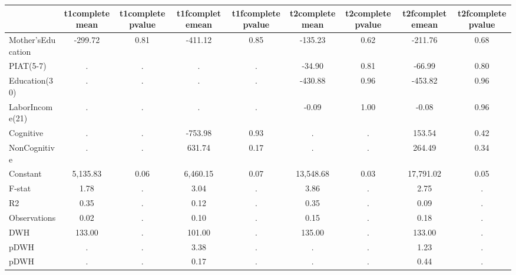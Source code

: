 \begin{table}[htbp]
\begin{tabular}{lcccccccc} \hline \hline
 & t1completemean  & t1completepvalue  & t1fcompletemean  & t1fcompletepvalue  & t2completemean  & t2completepvalue  & t2fcompletemean  & t2fcompletepvalue  \\  \hline 
Mother'sEducation &      -299.72 &         0.81 &      -411.12 &         0.85 &      -135.23 &         0.62 &      -211.76 &         0.68 \\  
PIAT(5-7) &            . &            . &            . &            . &       -34.90 &         0.81 &       -66.99 &         0.80 \\  
Education(30) &            . &            . &            . &            . &      -430.88 &         0.96 &      -453.82 &         0.96 \\  
LaborIncome(21) &            . &            . &            . &            . &        -0.09 &         1.00 &        -0.08 &         0.96 \\  
Cognitive &            . &            . &      -753.98 &         0.93 &            . &            . &       153.54 &         0.42 \\  
NonCognitive &            . &            . &       631.74 &         0.17 &            . &            . &       264.49 &         0.34 \\  
Constant &     5,135.83 &         0.06 &     6,460.15 &         0.07 &    13,548.68 &         0.03 &    17,791.02 &         0.05 \\  
F-stat &         1.78 &            . &         3.04 &            . &         3.86 &            . &         2.75 &            . \\  
R2 &         0.35 &            . &         0.12 &            . &         0.35 &            . &         0.09 &            . \\  
Observations &         0.02 &            . &         0.10 &            . &         0.15 &            . &         0.18 &            . \\  
DWH &       133.00 &            . &       101.00 &            . &       135.00 &            . &       133.00 &            . \\  
pDWH &            . &            . &         3.38 &            . &            . &            . &         1.23 &            . \\  
pDWH &            . &            . &         0.17 &            . &            . &            . &         0.44 &            . \\  
\hline \hline \end{tabular}
\end{table}
